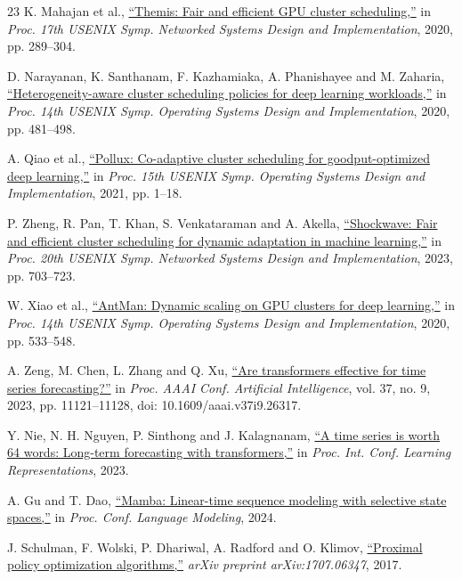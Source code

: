 \documentclass[conference]{IEEEtran}
\begin{document}
\begin{thebibliography}{23}
K. Mahajan et al., \href{https://www.usenix.org/conference/nsdi20/presentation/mahajan}{``Themis: Fair and efficient GPU cluster scheduling,''} in \emph{Proc. 17th USENIX Symp. Networked Systems Design and Implementation}, 2020, pp. 289--304.

D. Narayanan, K. Santhanam, F. Kazhamiaka, A. Phanishayee and M. Zaharia, \href{https://www.usenix.org/conference/osdi20/presentation/narayanan-deepak}{``Heterogeneity-aware cluster scheduling policies for deep learning workloads,''} in \emph{Proc. 14th USENIX Symp. Operating Systems Design and Implementation}, 2020, pp. 481--498.

A. Qiao et al., \href{https://www.usenix.org/conference/osdi21/presentation/qiao}{``Pollux: Co-adaptive cluster scheduling for goodput-optimized deep learning,''} in \emph{Proc. 15th USENIX Symp. Operating Systems Design and Implementation}, 2021, pp. 1--18.

P. Zheng, R. Pan, T. Khan, S. Venkataraman and A. Akella, \href{https://www.usenix.org/conference/nsdi23/presentation/zheng}{``Shockwave: Fair and efficient cluster scheduling for dynamic adaptation in machine learning,''} in \emph{Proc. 20th USENIX Symp. Networked Systems Design and Implementation}, 2023, pp. 703--723.

W. Xiao et al., \href{https://www.usenix.org/conference/osdi20/presentation/xiao}{``AntMan: Dynamic scaling on GPU clusters for deep learning,''} in \emph{Proc. 14th USENIX Symp. Operating Systems Design and Implementation}, 2020, pp. 533--548.

A. Zeng, M. Chen, L. Zhang and Q. Xu, \href{https://doi.org/10.1609/aaai.v37i9.26317}{``Are transformers effective for time series forecasting?''} in \emph{Proc. AAAI Conf. Artificial Intelligence}, vol. 37, no. 9, 2023, pp. 11121--11128, doi: 10.1609/aaai.v37i9.26317.

Y. Nie, N. H. Nguyen, P. Sinthong and J. Kalagnanam, \href{https://openreview.net/forum?id=Jbdc0vTOcol}{``A time series is worth 64 words: Long-term forecasting with transformers,''} in \emph{Proc. Int. Conf. Learning Representations}, 2023.

A. Gu and T. Dao, \href{https://openreview.net/forum?id=tEYskw1VY2}{``Mamba: Linear-time sequence modeling with selective state spaces,''} in \emph{Proc. Conf. Language Modeling}, 2024.

J. Schulman, F. Wolski, P. Dhariwal, A. Radford and O. Klimov, \href{https://arxiv.org/abs/1707.06347}{``Proximal policy optimization algorithms,''} \emph{arXiv preprint arXiv:1707.06347}, 2017.


\end{thebibliography}
\end{document}
